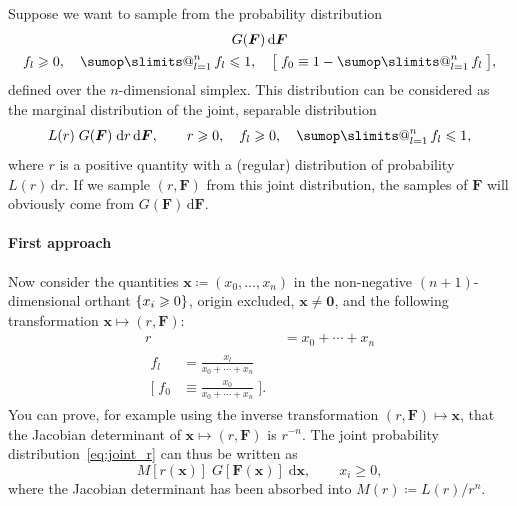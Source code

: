\documentclass[\ifafour a4paper,12pt,\else a5paper,10pt,\fi%
onecolumn,oneside,article,%
british%
]{memoir}
\makeatletter
\theoremstyle{remark}
\theoremstyle{innote}
\def\sum{\DOTSI\sumop\slimits@}
\newcommand*{\di}{\mathrm{d}}%
\newcommand*{\defd}{\coloneqq}
\newcommand*{\suchthat}{\mid}%
\renewcommand*{\le}{\leqslant}%
\renewcommand*{\ge}{\geqslant}%
\DeclarePairedDelimiter\set{\{}{\}}
\renewcommand*{\|}[1][]{\nonscript\,#1\vert\nonscript\;\mathopen{}}
\newcommand*{\tsum}{\mathop{\textstyle\sum}\nolimits}
\newcommand*{\yff}{f}
\newcommand*{\yf}{\bm{\yff}}
\newcommand*{\yfi}{\bm{F}}
\newcommand*{\yg}{G}
\newcommand*{\yh}{L}
\newcommand*{\yhb}{M}
\newcommand*{\ysim}{\triangle}
\newcommand*{\yyy}{x}
\newcommand*{\yy}{\bm{\yyy}}
\makeatother
\begin{document}
\bigskip

Suppose we want to sample from the probability distribution
\begin{equation}
\label{eq:main_distribution}
\begin{gathered}
\yg(\yfi)\,\di\yfi\\
\yff_{l} \ge 0, \quad  \tsum_{l=1}^{n}\yff_{l} \le 1,
\quad
\bigl[\; \yff_{0}\equiv 1-\tsum_{l=1}^{n}\yff_{l} \;\bigr],
\end{gathered}
\end{equation}
defined over the $n$-dimensional simplex. %
This distribution can be considered as the marginal distribution of the
joint, separable distribution
\begin{equation}
  \label{eq:joint_r}
  \yh(r)\;\yg(\yfi)\;\di r\,\di\yfi,
  \qquad r \ge 0,\quad
  \yff_{l} \ge 0, \quad  \tsum_{l=1}^{n}\yff_{l} \le 1,
\end{equation}
where $r$ is a positive quantity with a (regular) distribution of
probability $\yh(r)\,\di r$. If we sample $(r, \yfi)$ from this joint
distribution, the samples of $\yfi$ will obviously come from
$\yg(\yfi)\,\di\yfi$.


\paragraph{First approach}
  
Now consider the quantities $\yy \defd (\yyy_{0}, \dotsc, \yyy_{n})$ in the
non-negative $(n+1)$-dimensional orthant $\set{\yyy_{i} \ge 0}$, origin
excluded, $\yy \ne \bm{0}$, and the following
transformation $\yy \mapsto (r,\yfi)$:
\begin{subequations}
  \label{eq:main_transformation}
  \begin{align}
      \label{eq:main_transformation_r}
    r&= \yyy_{0} + \dotsb + \yyy_{n} \\
      \label{eq:main_transformation_f}
    \begin{split}
    \yff_{l}&= \frac{\yyy_{l}}{\yyy_{0} + \dotsb + \yyy_{n}}
    \\
    \biggl[\; \yff_{0}&\equiv \frac{\yyy_{0}}{\yyy_{0} + \dotsb + \yyy_{n}}
                         \;\biggr].
                       \end{split}
  \end{align}
\end{subequations}
You can prove, for example using the inverse transformation
$(r,\yfi) \mapsto \yy$, that the Jacobian determinant of
$\yy \mapsto (r,\yfi)$ is $r^{-n}$. The joint probability
distribution~\eqref{eq:joint_r} can thus be written as
\begin{equation}
  \label{eq:joint_x}
  \yhb[r(\yy)]\;\yg[\yfi(\yy)]\;\di\yy,
  \qquad \yyy_{i} \ge 0,
\end{equation}
where the Jacobian determinant has been absorbed into
$\yhb(r) \defd \yh(r)/r^{n}$.
\end{document}
